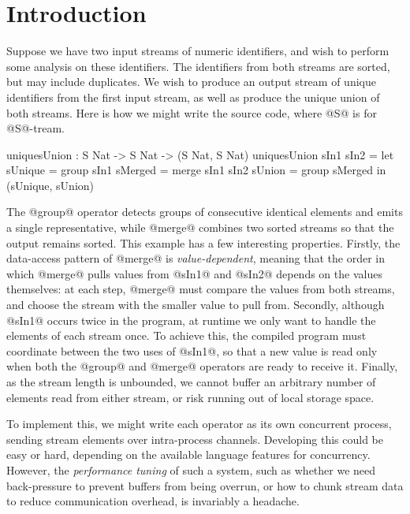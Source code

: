 \section{Introduction}
\label{s:Introduction}

Suppose we have two input streams of numeric identifiers, and wish to perform some analysis on these identifiers. The identifiers from both streams are sorted, but may include duplicates. We wish to produce an output stream of unique identifiers from the first input stream, as well as produce the unique union of both streams. Here is how we might write the source code, where @S@ is for @S@-tream.
\begin{code}
  uniquesUnion : S Nat -> S Nat -> (S Nat, S Nat)
  uniquesUnion sIn1 sIn2
   = let  sUnique = group sIn1
          sMerged = merge sIn1 sIn2
          sUnion  = group sMerged
     in   (sUnique, sUnion)
\end{code}

The @group@ operator detects groups of consecutive identical elements and emits a single representative, while @merge@ combines two sorted streams so that the output remains sorted. This example has a few interesting properties. Firstly, the data-access pattern of @merge@ is \emph{value-dependent}, meaning that the order in which @merge@ pulls values from @sIn1@ and @sIn2@ depends on the values themselves: at each step, @merge@ must compare the values from both streams, and choose the stream with the smaller value to pull from.
Secondly, although @sIn1@ occurs twice in the program, at runtime we only want to handle the elements of each stream once. To achieve this, the compiled program must coordinate between the two uses of @sIn1@, so that a new value is read only when both the @group@ and @merge@ operators are ready to receive it. Finally, as the stream length is unbounded, we cannot buffer an arbitrary number of elements read from either stream, or risk running out of local storage space.

To implement this, we might write each operator as its own concurrent process, sending stream elements over intra-process channels.
Developing this could be easy or hard, depending on the available language features for concurrency.
However, the \emph{performance tuning} of such a system, such as whether we need back-pressure to prevent buffers from being overrun, or how to chunk stream data to reduce communication overhead, is invariably a headache. 

